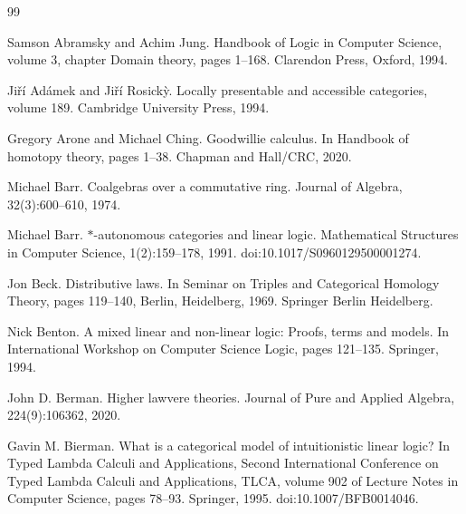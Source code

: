 \documentclass[10pt,a4paper]{article}
\begin{document}
 
 
 

\begin{thebibliography}{99}
\par\noindent    Samson Abramsky and Achim Jung.  Handbook of Logic in Computer Science, volume 3, chapter Domain theory, pages 1–168.  Clarendon Press, Oxford, 1994.  

\par\noindent    Jiří Adámek and Jiří Rosickỳ.  Locally presentable and accessible categories, volume 189.  Cambridge University Press, 1994.  

\par\noindent    Gregory Arone and Michael Ching.  Goodwillie calculus.  In Handbook of homotopy theory, pages 1–38. Chapman and Hall/CRC, 2020.  

\par\noindent    Michael Barr.  Coalgebras over a commutative ring.  Journal of Algebra, 32(3):600–610, 1974.  

\par\noindent    Michael Barr.  $*$-autonomous categories and linear logic.  Mathematical Structures in Computer Science, 1(2):159–178, 1991.  doi:10.1017/S0960129500001274.  

\par\noindent    Jon Beck.  Distributive laws.  In Seminar on Triples and Categorical Homology Theory, pages 119–140, Berlin, Heidelberg, 1969. Springer Berlin Heidelberg.  

\par\noindent    Nick Benton.  A mixed linear and non-linear logic: Proofs, terms and models.  In International Workshop on Computer Science Logic, pages 121–135. Springer, 1994.  

\par\noindent    John D. Berman.  Higher lawvere theories.  Journal of Pure and Applied Algebra, 224(9):106362, 2020.  

\par\noindent    Gavin M. Bierman.  What is a categorical model of intuitionistic linear logic?  In Typed Lambda Calculi and Applications, Second International Conference on Typed Lambda Calculi and Applications, TLCA, volume 902 of Lecture Notes in Computer Science, pages 78–93. Springer, 1995.  doi:10.1007/BFB0014046.  


\end{thebibliography}
\end{document}
